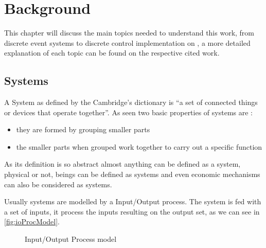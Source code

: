 
\chapter{Background}
\label{cha:background}
This chapter will discuss the main topics needed to understand this work, from
discrete event systems to discrete control implementation on \PLCs, a more
detailed explanation of each topic can be found on the respective cited work.
\section{Systems}

A System as defined by the Cambridge's dictionary is ``a set of connected things
or devices that operate together''. As seen two basic properties of systems are
:
\begin{itemize}
\item they are formed by grouping smaller parts
\item the smaller parts when grouped work together to carry out a specific
  function
\end{itemize}

As its definition is so abstract almost anything can be defined as a system,
physical or not, beings can be defined as systems and even economic mechanisms
can also be considered as systems.

Usually systems are modelled by a Input\slash Output process. The system is fed with a
set of inputs, it process the inputs resulting on the output set, as we can see
in \autoref{fig:ioProcModel}.

\begin{figure}[H]
  \centering
  \caption{Input\slash Output Process model}
    \label{fig:ioProcModel}
\end{figure}



